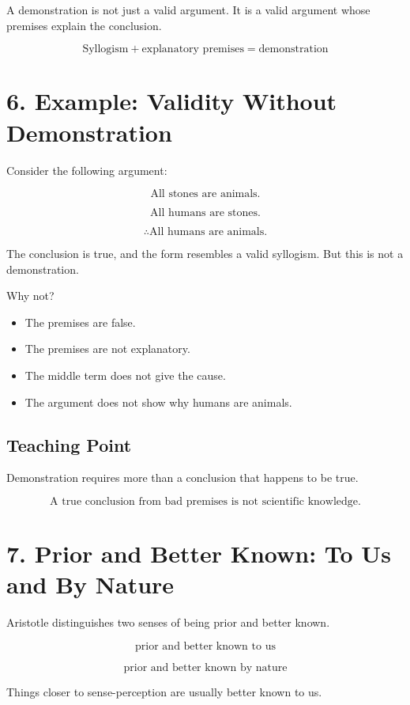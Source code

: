 \documentclass[12pt]{article}
\begin{document}
A demonstration is not just a valid argument. It is a valid argument whose
premises explain the conclusion.

\[
\boxed{
\text{Syllogism} + \text{explanatory premises}
=
\text{demonstration}
}
\]

\section*{6. Example: Validity Without Demonstration}

Consider the following argument:

\[
\text{All stones are animals.}
\]

\[
\text{All humans are stones.}
\]

\[
\therefore \text{All humans are animals.}
\]

The conclusion is true, and the form resembles a valid syllogism. But this is
not a demonstration.

Why not?

\begin{itemize}[itemsep=0.25em]
    \item The premises are false.
    \item The premises are not explanatory.
    \item The middle term does not give the cause.
    \item The argument does not show why humans are animals.
\end{itemize}

\subsection*{Teaching Point}

Demonstration requires more than a conclusion that happens to be true.

\[
\boxed{
\text{A true conclusion from bad premises is not scientific knowledge.}
}
\]

\section*{7. Prior and Better Known: To Us and By Nature}

Aristotle distinguishes two senses of being prior and better known.

\[
\text{prior and better known to us}
\]

\[
\text{prior and better known by nature}
\]

Things closer to sense-perception are usually better known to us.
\end{document}
